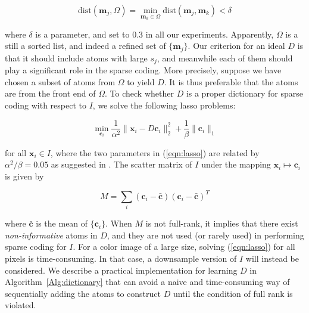\begin{equation}
\mathrm{dist}(\mathbf{m}_j, \Omega) = \min\limits_{\mathbf{m}_k \in \Omega} \mathrm{dist}(\mathbf{m}_j, \mathbf{m}_k) < \delta
\label{eqn:delta}
\end{equation}

\noindent where $\delta$ is a parameter, and set to $0.3$ in all our experiments.
Apparently, $\Omega$ is a still a sorted list, 
and indeed a refined set of $\{ \mathbf{m}_j\}$. 
Our criterion for an ideal $D$ is that it should include atoms with large $s_j$, 
and meanwhile each of them should play a significant role in the sparse coding. 
More precisely, suppose we have chosen a subset of atoms from $\Omega$ to yield $D$.
It is thus preferable that the atoms are from the front end of $\Omega$. 
To check whether $D$ is a proper dictionary for sparse coding with respect to $I$,
we solve the following lasso problems:

\begin{equation}
\min\limits_{\mathbf{c}_i} \frac{1}{\alpha^2} \| \mathbf{x}_i - D\mathbf{c}_i \|^2_2 + \frac{1}{\beta} \|\mathbf{c}_i\|_1
\label{eqn:lasso}
\end{equation}

\noindent for all $\mathbf{x}_i \in I$, 
where the two parameters in (\ref{eqn:lasso}) are related by $\alpha^2/\beta = 0.05$
as suggested in \cite{YangYH10}. 
The scatter matrix of $I$ under the mapping $\mathbf{x}_i \mapsto \mathbf{c}_i$ is given by

\begin{equation}
M = \sum\limits_i (\mathbf{c}_i-\bar{\mathbf{c}})(\mathbf{c}_i-\bar{\mathbf{c}})^T
\label{eqn:scatter}
\end{equation}

\noindent where $\bar{\mathbf{c}}$ is the mean of $\{\mathbf{c}_i\}$. 
When $M$ is not full-rank, it implies that there exist {\em non-informative} atoms in $D$,
and they are not used (or rarely used) in performing sparse coding for $I$.
For a color image of a large size, solving (\ref{eqn:lasso}) for all pixels 
is time-consuming. 
In that case, a downsample version of $I$ will instead be considered. 
We describe a practical implementation for learning $D$ in Algorithm~\ref{Alg:dictionary}
that can avoid a naive and time-consuming way of sequentially adding the atoms to construct
$D$ until the condition of full rank is violated.

